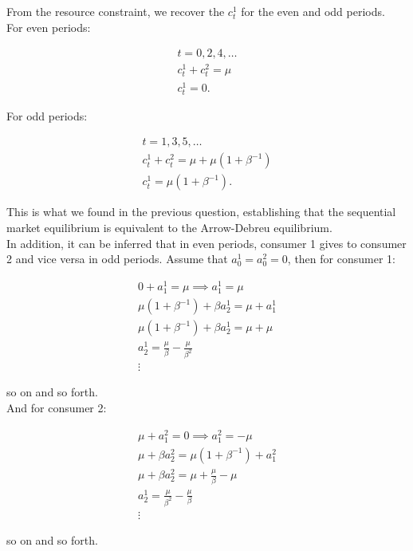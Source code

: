 \documentclass{article}
\begin{document}
From the resource constraint, we recover the $c^1_t$ for the even and odd periods. \\

For even periods:

\begin{gather*}
    t = 0, 2, 4, \hdots \\
    c^1_t + c^2_t = \mu \\
    c^1_t = 0.
\end{gather*}

For odd periods:

\begin{gather*}
    t = 1, 3, 5, \hdots \\
    c^1_t + c^2_t = \mu + \mu(1+\beta^{-1}) \\
    c^1_t = \mu(1+\beta^{-1}).
\end{gather*}

This is what we found in the previous question, establishing that the sequential market equilibrium is equivalent to the Arrow-Debreu equilibrium. \\

In addition, it can be inferred that in even periods, consumer 1 gives to consumer 2 and vice versa in odd periods. Assume that $a^1_0 = a^2_0 = 0$, then for consumer 1:

\begin{gather*}
    0 + a^1_1 = \mu 
    \implies a^1_1 = \mu \\
    \mu(1+\beta^{-1}) + \beta a_2^1 = \mu + a^1_1 \\
    \mu(1+\beta^{-1}) + \beta a_2^1 = \mu + \mu \\
    a_2^1 = \frac{\mu}{\beta}-\frac{\mu}{\beta^2} \\
    \vdots
\end{gather*}

so on and so forth.\\

And for consumer 2:

\begin{gather*}
    \mu + a^2_1 = 0 
    \implies a^2_1 = -\mu \\
    \mu + \beta a_2^2 = \mu(1+\beta^{-1}) + a^2_1 \\
    \mu + \beta a_2^2 = \mu + \frac{\mu}{\beta} -\mu \\
    a_2^1 = \frac{\mu}{\beta^2}-\frac{\mu}{\beta} \\
    \vdots
\end{gather*}

so on and so forth.\\
\end{document}
